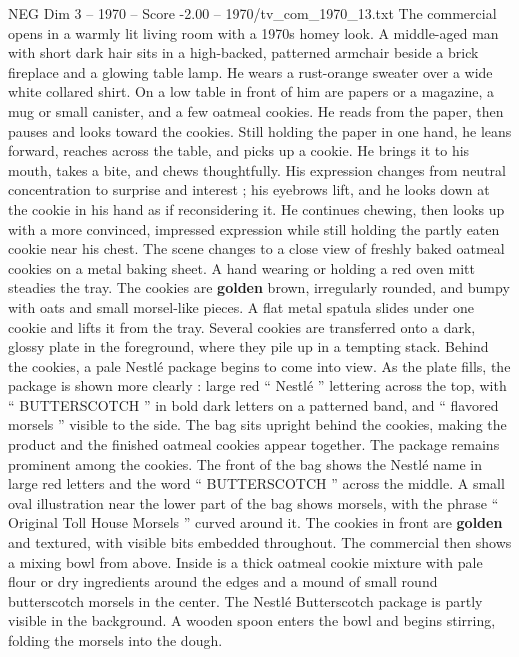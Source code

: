 \begin{textsample}{NEG Dim 3 – 1970 – Score -2.00 – 1970/tv\_com\_1970\_13.txt}  \label{ex:f3_neg_068}
The commercial opens in a warmly lit living room with a 1970s homey look.
A middle-aged man with short dark hair sits in a high-backed, patterned armchair beside a brick fireplace and a glowing table lamp.
He wears a rust-orange sweater over a wide white collared shirt.
On a low table in front of him are papers or a magazine, a mug or small canister, and a few oatmeal cookies.
He reads from the paper, then pauses and looks toward the cookies.
Still holding the paper in one hand, he leans forward, reaches across the table, and picks up a cookie.
He brings it to his mouth, takes a bite, and chews thoughtfully.
His expression changes from neutral concentration to surprise and interest ; his eyebrows lift, and he looks down at the cookie in his hand as if reconsidering it.
He continues chewing, then looks up with a more convinced, impressed expression while still holding the partly eaten cookie near his chest.
The scene changes to a close view of freshly baked oatmeal cookies on a metal baking sheet.
A hand wearing or holding a red oven mitt steadies the tray.
The cookies are \textbf{golden} brown, irregularly rounded, and bumpy with oats and small morsel-like pieces.
A flat metal spatula slides under one cookie and lifts it from the tray.
Several cookies are transferred onto a dark, glossy plate in the foreground, where they pile up in a tempting stack.
Behind the cookies, a pale Nestlé package begins to come into view.
As the plate fills, the package is shown more clearly : large red “ Nestlé ” lettering across the top, with “ BUTTERSCOTCH ” in bold dark letters on a patterned band, and “ flavored morsels ” visible to the side.
The bag sits upright behind the cookies, making the product and the finished oatmeal cookies appear together.
The package remains prominent among the cookies.
The front of the bag shows the Nestlé name in large red letters and the word “ BUTTERSCOTCH ” across the middle.
A small oval illustration near the lower part of the bag shows morsels, with the phrase “ Original Toll House Morsels ” curved around it.
The cookies in front are \textbf{golden} and textured, with visible bits embedded throughout.
The commercial then shows a mixing bowl from above.
Inside is a thick oatmeal cookie mixture with pale flour or dry ingredients around the edges and a mound of small round butterscotch morsels in the center.
The Nestlé Butterscotch package is partly visible in the background.
A wooden spoon enters the bowl and begins stirring, folding the morsels into the dough.

\end{textsample}
